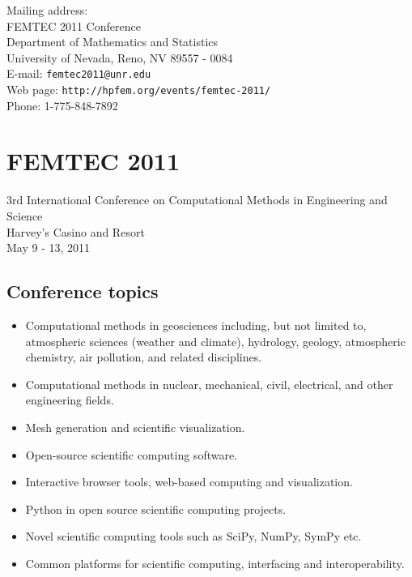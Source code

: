 \documentclass[article,A4,11pt]{llncs}%
\begin{document}
Mailing address:\\
FEMTEC 2011 Conference\\
Department of Mathematics and Statistics\\
University of Nevada, Reno, NV 89557 - 0084\\ 

\noindent
E-mail: {\tt femtec2011@unr.edu}\\
Web page: {\tt http://hpfem.org/events/femtec-2011/}\\
Phone: 1-775-848-7892

\chapter*{\huge FEMTEC 2011}
\vspace{-5mm}
\normalsize   
\begin{center}
3rd International Conference on Computational Methods in Engineering and Science\\
Harvey's Casino and Resort\\ 
May 9 - 13, 2011\\
\end{center}
\vspace{-3mm}

\section*{Conference topics}%

\begin{itemize}
  \item Computational methods in geosciences including, but not limited to, 
        atmospheric sciences (weather and climate), hydrology, geology, 
        atmospheric chemistry, air pollution, and related disciplines. 
  \item Computational methods in nuclear, mechanical, civil, electrical, and 
        other engineering fields. 
  \item Mesh generation and scientific visualization. 
  \item Open-source scientific computing software.
  \item Interactive browser tools, web-based computing and visualization.
  \item Python in open source scientific computing projects.
  \item Novel scientific computing tools such as SciPy, NumPy, SymPy etc.
  \item Common platforms for scientific computing, interfacing and interoperability.
\end{itemize}
\end{document}
